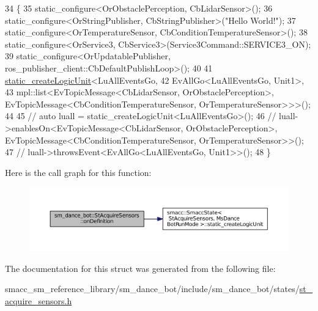 \begin{DoxyCode}
34    \{
35       static\_configure<OrObstaclePerception, CbLidarSensor>();
36       static\_configure<OrStringPublisher, CbStringPublisher>(\textcolor{stringliteral}{"Hello World!"});
37       static\_configure<OrTemperatureSensor, CbConditionTemperatureSensor>();
38       static\_configure<OrService3, CbService3>(Service3Command::SERVICE3\_ON);
39       static\_configure<OrUpdatablePublisher, ros\_publisher\_client::CbDefaultPublishLoop>();
40 
41       \hyperlink{classsmacc_1_1SmaccState_a6fc90cf59c60c749e82f49aafb079b23}{static\_createLogicUnit}<LuAllEventsGo,
42                              EvAllGo<LuAllEventsGo, Unit1>,
43                              mpl::list<EvTopicMessage<CbLidarSensor, OrObstaclePerception>, 
      EvTopicMessage<CbConditionTemperatureSensor, OrTemperatureSensor>>>();
44 
45       \textcolor{comment}{// auto luall = static\_createLogicUnit<LuAllEventsGo>();}
46       \textcolor{comment}{// luall->enablesOn<EvTopicMessage<CbLidarSensor, OrObstaclePerception>,
       EvTopicMessage<CbConditionTemperatureSensor, OrTemperatureSensor>>();}
47       \textcolor{comment}{// luall->throwsEvent<EvAllGo<LuAllEventsGo, Unit1>>();}
48    \}
\end{DoxyCode}


Here is the call graph for this function\+:
\nopagebreak
\begin{figure}[H]
\begin{center}
\leavevmode
\includegraphics[width=350pt]{structsm__dance__bot_1_1StAcquireSensors_ae30f4b633faa922070fc8412b6dd78fc_cgraph}
\end{center}
\end{figure}




The documentation for this struct was generated from the following file\+:\begin{DoxyCompactItemize}
\item 
smacc\+\_\+sm\+\_\+reference\+\_\+library/sm\+\_\+dance\+\_\+bot/include/sm\+\_\+dance\+\_\+bot/states/\hyperlink{st__acquire__sensors_8h}{st\+\_\+acquire\+\_\+sensors.\+h}\end{DoxyCompactItemize}
